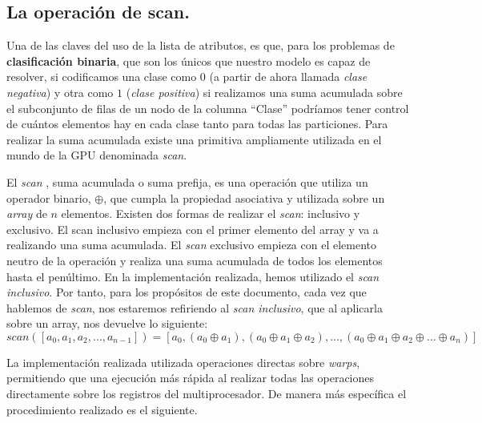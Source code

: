 \subsection{La operación de scan.}
Una de las claves del uso de la lista de atributos, es que, para los problemas de \textbf{clasificación binaria}, que son los únicos que nuestro modelo es capaz de resolver, si codificamos una clase como $0$ (a partir de ahora llamada \textit{clase negativa}) y otra como $1$ (\textit{clase positiva}) si realizamos una suma acumulada sobre el subconjunto de filas de un nodo de la columna ``Clase'' podríamos tener control de cuántos elementos hay en cada clase tanto para todas las particiones. Para realizar la suma acumulada existe una primitiva ampliamente utilizada en el mundo de la GPU denominada \textit{scan}.

El \textit{scan} \cite{scan}, suma acumulada o suma prefija, es una operación que utiliza un operador binario, $\oplus$, que cumpla la propiedad asociativa y utilizada sobre un \textit{array} de $n$ elementos. Existen dos formas de realizar el \textit{scan}: inclusivo y exclusivo. El scan inclusivo empieza con el primer elemento del array y va a realizando una suma acumulada. El \textit{scan} exclusivo empieza con el elemento neutro de la operación y realiza una suma acumulada de todos los elementos hasta el penúltimo. En la implementación realizada, hemos utilizado el \textit{scan inclusivo}. Por tanto, para los propósitos de este documento, cada vez que hablemos de \textit{scan}, nos estaremos refiriendo al \textit{scan inclusivo}, que al aplicarla sobre un array, nos devuelve lo siguiente:
$$scan([a_0, a_1, a_2, ..., a_{n-1}]) = [ a_0, (a_0 \oplus a_1), (a_0 \oplus a_1 \oplus a_2), ..., (a_0 \oplus a_1 \oplus a_2 \oplus ... \oplus a_{n})]$$

La implementación realizada utilizada operaciones directas sobre \textit{warps}, permitiendo que una ejecución más rápida al realizar todas las operaciones directamente sobre los registros del multiprocesador. De manera más específica el procedimiento realizado es el siguiente.

